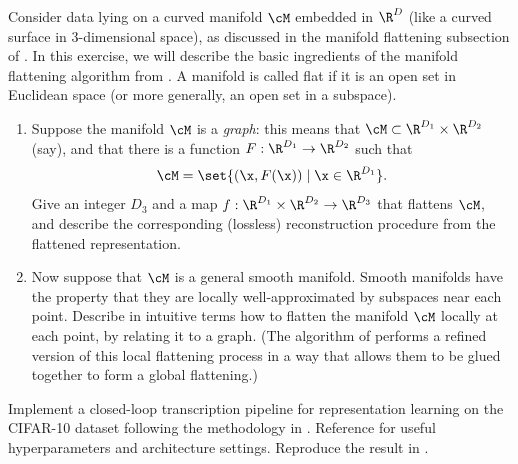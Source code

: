 \documentclass[../../book-main.tex]{subfiles}
\begin{document}
\begin{exercise}
Consider data lying on a curved manifold $\cM$ embedded in $\R^D$ (like
a curved surface in $3$-dimensional space), as discussed in the manifold
flattening subsection of .
In this exercise, we will describe the basic ingredients of the manifold
flattening algorithm from \cite{Psenka-JMLR24}.
A manifold is called flat if it is an open set in Euclidean space (or
more generally, an open set in a subspace).

\begin{enumerate}
\item Suppose the manifold $\cM$ is a \textit{graph}: this means that $\cM
    \subset \R^{D_1} \times \R^{D_2}$ (say), and that there is a function $F
    : \R^{D_1} \to \R^{D_2}$ such that
    \begin{equation}
        \cM = \set{(\x, F(\x)) \mid \x \in \R^{D_1}}.
    \end{equation}
    Give an integer $D_3$ and a map $f : \R^{D_1} \times \R^{D_2} \to \R^{D_3}$
    that flattens $\cM$, and describe the corresponding (lossless)
    reconstruction procedure from the flattened representation.
\item Now suppose that $\cM$ is a general smooth manifold. Smooth manifolds
    have the property that they are locally well-approximated by subspaces
    near each point. Describe in intuitive terms how to flatten the manifold
    $\cM$ locally at each point, by relating it to a graph. (The algorithm of
        \cite{Psenka-JMLR24} performs a refined version of this local flattening
        process in a way that allows them to be glued together to form a global
    flattening.)
\end{enumerate}
\end{exercise}

\begin{exercise}

Implement a closed-loop transcription pipeline for representation learning on
the CIFAR-10 dataset following
the methodology in .
Reference \cite{Dai-entropy-2022} for useful hyperparameters and architecture
settings. Reproduce the result in .

\end{exercise}
\end{document}
